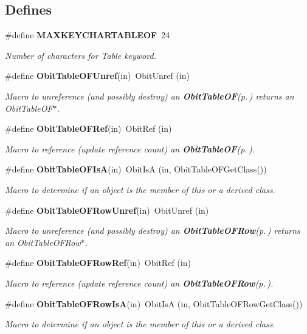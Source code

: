 \subsection*{Defines}
\begin{CompactItemize}
\item 
\#define {\bf MAXKEYCHARTABLEOF}\ 24
\begin{CompactList}\small\item\em Number of characters for Table keyword. \item\end{CompactList}\item 
\#define {\bf Obit\-Table\-OFUnref}(in)\ Obit\-Unref (in)
\begin{CompactList}\small\item\em Macro to unreference (and possibly destroy) an {\bf Obit\-Table\-OF}{\rm (p.\,\pageref{structObitTableOF})} returns an Obit\-Table\-OF$\ast$. \item\end{CompactList}\item 
\#define {\bf Obit\-Table\-OFRef}(in)\ Obit\-Ref (in)
\begin{CompactList}\small\item\em Macro to reference (update reference count) an {\bf Obit\-Table\-OF}{\rm (p.\,\pageref{structObitTableOF})}. \item\end{CompactList}\item 
\#define {\bf Obit\-Table\-OFIs\-A}(in)\ Obit\-Is\-A (in, Obit\-Table\-OFGet\-Class())
\begin{CompactList}\small\item\em Macro to determine if an object is the member of this or a derived class. \item\end{CompactList}\item 
\#define {\bf Obit\-Table\-OFRow\-Unref}(in)\ Obit\-Unref (in)
\begin{CompactList}\small\item\em Macro to unreference (and possibly destroy) an {\bf Obit\-Table\-OFRow}{\rm (p.\,\pageref{structObitTableOFRow})} returns an Obit\-Table\-OFRow$\ast$. \item\end{CompactList}\item 
\#define {\bf Obit\-Table\-OFRow\-Ref}(in)\ Obit\-Ref (in)
\begin{CompactList}\small\item\em Macro to reference (update reference count) an {\bf Obit\-Table\-OFRow}{\rm (p.\,\pageref{structObitTableOFRow})}. \item\end{CompactList}\item 
\#define {\bf Obit\-Table\-OFRow\-Is\-A}(in)\ Obit\-Is\-A (in, Obit\-Table\-OFRow\-Get\-Class())
\begin{CompactList}\small\item\em Macro to determine if an object is the member of this or a derived class. \item\end{CompactList}\end{CompactItemize}

